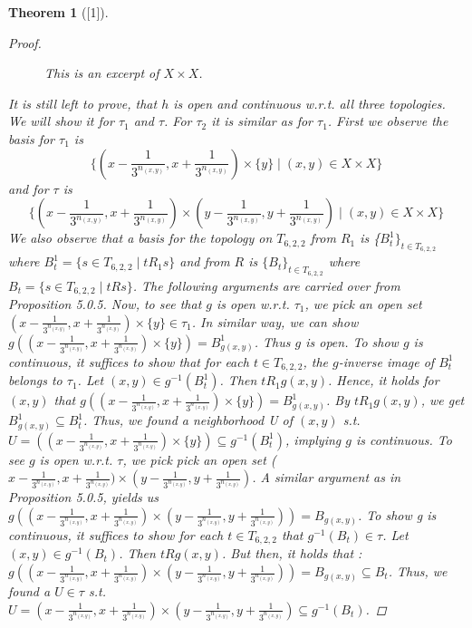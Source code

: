 \documentclass[12pt, a4paper]{scrartcl}
\newtheorem{theorem}[definition]{Theorem}
\begin{document}
\begin{theorem}[\textnormal{[1]}]
\begin{proof}
\begin{figure}[h]
\begin{center}
\begin{tikzpicture}[scale=0.73]
    \end{tikzpicture}
    \caption{This is an excerpt of $X \times X$.}
\end{center}
\end{figure}    
    It is still left to prove, that $h$ is open and continuous w.r.t. all three topologies. We will show it for $\tau_1$ and $\tau$. For $\tau_2$ it is similar as for $\tau_1$.\newline \newline
    First we observe the basis for $\tau_1$ is 
    $$\{(x - \frac{1}{3^{n_{(x,y)}}}, x +\frac{1}{3^{n_{(x,y)}}}) \times \{y\} \mid (x,y) \in X \times X\}$$
    and for $\tau$ is 
    $$\{(x - \frac{1}{3^{n_{(x,y)}}}, x +\frac{1}{3^{n_{(x,y)}}}) \times (y - \frac{1}{3^{n_{(x,y)}}}, y +\frac{1}{3^{n_{(x,y)}}}) \mid (x,y) \in X \times X\}$$
    We also observe that a basis for the topology on $T_{6,2,2}$ from $R_1$ is \{$B^1_t\}_{t \in T_{6,2,2}}$ where $B^1_t = \{s \in T_{6,2,2} \mid t R_1 s\}$ 
    and from $R$ is $\{B_t\}_{t \in T_{6,2,2}}$ where $B_t = \{s \in T_{6,2,2} \mid t R s\}$. The following arguments are carried over from Proposition 5.0.5. \newline
    Now, to see that $g$ is open w.r.t. $\tau_1$, we pick an open set $(x - \frac{1}{3^{n_{(x,y)}}}, x + \frac{1}{3^{n_{(x,y)}}}) \times \{y\} \in \tau_1$. 
    In similar way, we can show $g((x - \frac{1}{3^{n_{(x,y)}}}, x + \frac{1}{3^{n_{(x,y)}}}) \times \{y\}) = B^1_{g(x,y)}$. Thus $g$ is open.
    To show $g$ is continuous, it suffices to show that for each $t \in T_{6,2,2}$, the $g$-inverse image of $B^1_t$ belongs to $\tau_1$. Let $(x,y) \in g^{-1}(B^1_t)$. 
    Then $tR_1g(x,y)$. Hence, it holds for $(x,y)$ that $g((x - \frac{1}{3^{n_{(x,y)}}}, x + \frac{1}{3^{n_{(x,y)}}}) \times \{y\}) = B^1_{g(x,y)}$. By $t R_1g(x,y)$, we get
    $B^1_{g(x,y)} \subseteq B^1_t$. Thus, we found a neighborhood U of $(x,y)$ s.t. $U = ((x - \frac{1}{3^{n_{(x,y)}}}, x + \frac{1}{3^{n_{(x,y)}}}) \times \{y\}) \subseteq g^{-1}(B^1_t)$, implying $g$ is continuous.  \newline
    To see $g$ is open w.r.t. $\tau$, we pick pick an open set ($x- \frac{1}{3^{n_{(x,y)}}}, x+ \frac{1}{3^{n_{(x,y)}}}) \times (y- \frac{1}{3^{n_{(x,y)}}}, y+ \frac{1}{3^{n_{(x,y)}}})$. A similar argument as in Proposition 5.0.5, yields 
    us $g((x- \frac{1}{3^{n_{(x,y)}}}, x+ \frac{1}{3^{n_{(x,y)}}}) \times (y- \frac{1}{3^{n_{(x,y)}}}, y+ \frac{1}{3^{n_{(x,y)}}})) = B_{g(x,y)}$. \newline
    To show g is continuous, it suffices to show for each $t \in T_{6,2,2}$ that $g^{-1}(B_t) \in \tau$. Let $(x,y) \in g^{-1}(B_t)$. Then $tRg(x,y)$. But then, it holds that :
    $g((x- \frac{1}{3^{n_{(x,y)}}}, x+ \frac{1}{3^{n_{(x,y)}}}) \times (y- \frac{1}{3^{n_{(x,y)}}}, y+ \frac{1}{3^{n_{(x,y)}}})) = B_{g(x,y)} \subseteq B_t$. Thus, we found a $U \in \tau$ 
    s.t. $U = (x- \frac{1}{3^{n_{(x,y)}}}, x+ \frac{1}{3^{n_{(x,y)}}}) \times (y- \frac{1}{3^{n_{(x,y)}}}, y+ \frac{1}{3^{n_{(x,y)}}}) \subseteq g^{-1}(B_t)$.


\end{proof}
\end{theorem}
\end{document}
